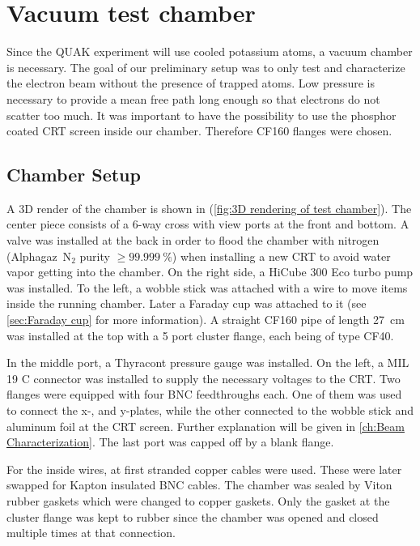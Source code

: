 
\chapter{Vacuum test chamber}
\label{ch:Vacuum chamber}

Since the QUAK experiment will use cooled potassium atoms, a vacuum chamber is necessary. The goal of our preliminary setup was to only test and characterize the electron beam without the presence of trapped atoms. Low pressure is necessary to provide a mean free path long enough so that electrons do not scatter too much. It was important to have the possibility to use the phosphor coated CRT screen inside our chamber. Therefore CF160 flanges were chosen. 


\section{Chamber Setup}
\label{sec:Chamber Setup}

A 3D render of the chamber is shown in (\cref{fig:3D rendering of test chamber}). The center piece consists of a 6-way cross with view ports at the front and bottom. A valve was installed at the back in order to flood the chamber with nitrogen (Alphagaz\texttrademark~N$_2$ purity $\ge\SI{99.999}{\percent}$) when installing a new CRT to avoid water vapor getting into the chamber. On the right side, a HiCube 300 Eco turbo pump was installed. To the left, a wobble stick was attached with a wire to move items inside the running chamber. Later a Faraday cup was attached to it (see \cref{sec:Faraday cup} for more information). A straight CF160 pipe of length \SI{27}{\centi\meter} was installed at the top with a 5 port cluster flange, each being of type CF40.
 
In the middle port, a Thyracont  pressure gauge was installed. On the left, a MIL 19 C connector was installed to supply the necessary voltages to the CRT. Two flanges were equipped with four BNC feedthroughs each. One of them was used to connect the x-, and y-plates, while the other connected to the wobble stick and aluminum foil at the CRT screen. Further explanation will be given in \cref{ch:Beam Characterization}. The last port was capped off by a blank flange.
 
For the inside wires, at first stranded copper cables were used. These were later swapped for Kapton insulated BNC cables. The chamber was sealed by Viton rubber gaskets which were changed to copper gaskets. Only the gasket at the cluster flange was kept to rubber since the chamber was opened and closed multiple times at that connection.
 
